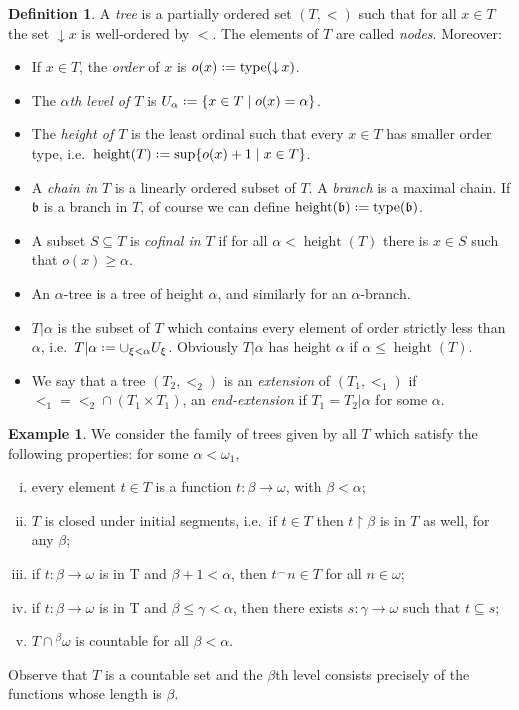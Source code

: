 \documentclass[11pt,a4paper]{report}
\theoremstyle{definition}
\newtheorem{defn}[theorem]{Definition}
\newtheorem{example}[theorem]{Example}
\theoremstyle{num.custom-title}
\theoremstyle{custom-title}
\DeclareMathOperator{\sse}{\subseteq}
\DeclareMathOperator{\type}{type}
\DeclareMathOperator{\height}{height}
\DeclareMathOperator{\restr}{\upharpoonright}
\DeclareMathOperator{\down}{\downarrow}
\newcommand{\conc}{^\frown}
\newcommand*{\defeq}{\mathrel{\rlap{%
                     \raisebox{0.3ex}{$\cdot$}}%
                     \raisebox{-0.3ex}{$\cdot$}}%
                     =}
\begin{document}
\begin{defn}
A \emph{tree} is a partially ordered set $(T,<)$ such that for all $x \in T$ the set $\down x$ is well-ordered by $<$. The elements of $T$ are called \emph{nodes}. Moreover:
\begin{itemize}
\item If $x \in T$, the \emph{order} of $x$ is $o(x) \defeq \type(\down x)$.
\item The \emph{$\alpha$th level of $T$} is $U_\alpha \defeq \{x \in T \mid o(x)=\alpha\}$.
\item The \emph{height of $T$} is the least ordinal such that every $x \in T$ has smaller order type, i.e.\ $\height(T) \defeq \sup\{o(x)+1 \mid x \in T\}$.
\item A \emph{chain in $T$} is a linearly ordered subset of $T$. A \emph{branch} is a maximal chain. If $\mathfrak{b}$ is a branch in $T$, of course we can define $\height(\mathfrak{b}) \defeq \type(\mathfrak{b})$.
\item A subset $S \sse T$ is \emph{cofinal in $T$} if for all $\alpha < \height(T)$ there is $x \in S$ such that $o(x) \geq \alpha$.
\item An $\alpha$-tree is a tree of height $\alpha$, and similarly for an $\alpha$-branch.
\item $T|\alpha$ is the subset of $T$ which contains every element of order strictly less than $\alpha$, i.e.\ $T|\alpha \defeq \cup_{\xi < \alpha} U_\xi$. Obviously $T|\alpha$ has height $\alpha$ if $\alpha \leq \height(T)$.
\item We say that a tree $(T_2,<_2)$ is an \emph{extension} of $(T_1,<_1)$ if ${<_1} = {<_2} \cap (T_1 \times T_1)$, an \emph{end-extension} if $T_1=T_2|\alpha$ for some $\alpha$.
\end{itemize}
\end{defn}

\begin{example}\label{example-countable_normal_trees}
We consider the family of trees given by all $T$ which satisfy the following properties: for some $\alpha < \omega_1$,
\begin{enumerate}[(i)]
\item every element $t \in T$ is a function $t \colon \beta \to \omega$, with $\beta < \alpha$;
\item $T$ is closed under initial segments, i.e.\ if $t \in T$ then $t \restr \beta$ is in $T$ as well, for any $\beta$;
\item if $t \colon \beta \to \omega$ is in T and $\beta+1 < \alpha$, then $t \conc n \in T$ for all $n \in \omega$;
\item if $t \colon \beta \to \omega$ is in T and $\beta \leq \gamma < \alpha$, then there exists $s \colon \gamma \to \omega$ such that $t \sse s$;
\item $T \cap {}^{\beta} \omega$ is countable for all $\beta < \alpha$.
\end{enumerate}
Observe that $T$ is a countable set and the $\beta$th level consists precisely of the functions whose length is $\beta$.
\end{example}
\end{document}
